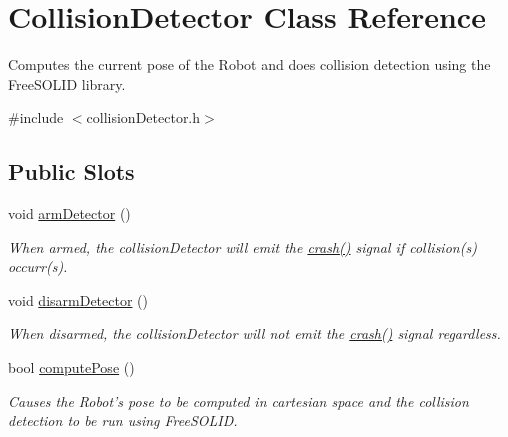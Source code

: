 \hypertarget{class_collision_detector}{
\section{CollisionDetector Class Reference}
\label{class_collision_detector}
}


Computes the current pose of the Robot and does collision detection using the FreeSOLID library.  


{\ttfamily \#include $<$collisionDetector.h$>$}\subsection*{Public Slots}
\begin{DoxyCompactItemize}
\item 
void \hyperlink{class_collision_detector_ad75885bcd649c22da007c91e91b17dfc}{armDetector} ()
\begin{DoxyCompactList}\small\item\em When armed, the collisionDetector will emit the \hyperlink{class_collision_detector_a7a6c1a9b11907db7252b6544ee1ce8b4}{crash()} signal if collision(s) occurr(s). \item\end{DoxyCompactList}\item 
void \hyperlink{class_collision_detector_a0ff5daf20c76c64a2e284f93bd5e50a3}{disarmDetector} ()
\begin{DoxyCompactList}\small\item\em When disarmed, the collisionDetector will not emit the \hyperlink{class_collision_detector_a7a6c1a9b11907db7252b6544ee1ce8b4}{crash()} signal regardless. \item\end{DoxyCompactList}\item 
bool \hyperlink{class_collision_detector_a92faad68f69ade7020a58f105f7d3aa8}{computePose} ()
\begin{DoxyCompactList}\small\item\em Causes the Robot's pose to be computed in cartesian space and the collision detection to be run using FreeSOLID. \item\end{DoxyCompactList}\end{DoxyCompactItemize}
